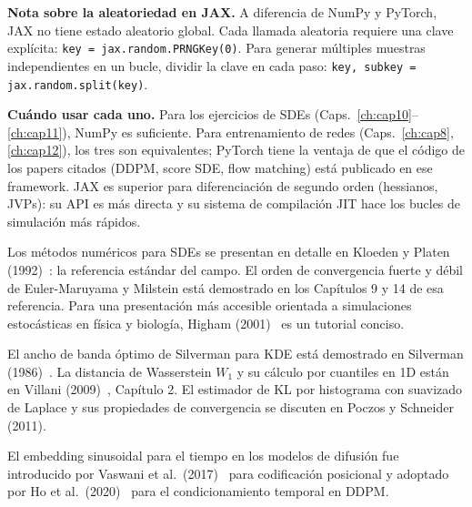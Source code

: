 \medskip
\noindent\textbf{Nota sobre la aleatoriedad en JAX.} A diferencia de NumPy y
PyTorch, JAX no tiene estado aleatorio global. Cada llamada aleatoria requiere
una clave explícita: \texttt{key = jax.random.PRNGKey(0)}. Para generar
múltiples muestras independientes en un bucle, dividir la clave en cada paso:
\texttt{key, subkey = jax.random.split(key)}.

\medskip
\noindent\textbf{Cuándo usar cada uno.}
Para los ejercicios de SDEs (Caps.~\ref{ch:cap10}--\ref{ch:cap11}),
NumPy es suficiente. Para entrenamiento de redes (Caps.~\ref{ch:cap8},
\ref{ch:cap12}), los tres son equivalentes; PyTorch tiene la ventaja de que
el código de los papers citados (DDPM, score SDE, flow matching) está
publicado en ese framework. JAX es superior para diferenciación de segundo
orden (hessianos, JVPs): su API es más directa y su sistema de
compilación JIT hace los bucles de simulación más rápidos.

\begin{notasbib}
Los métodos numéricos para SDEs se presentan en detalle en Kloeden y Platen
(1992)~\cite{kloeden1992numerical}: la referencia estándar del campo. El orden
de convergencia fuerte y débil de Euler-Maruyama y Milstein está demostrado en
los Capítulos 9 y 14 de esa referencia. Para una presentación más accesible
orientada a simulaciones estocásticas en física y biología, Higham
(2001)~\cite{higham2001algorithmic} es un tutorial conciso.

El ancho de banda óptimo de Silverman para KDE está demostrado en Silverman
(1986)~\cite{silverman1986density}. La distancia de Wasserstein $W_1$ y su
cálculo por cuantiles en 1D están en Villani (2009)~\cite{villani2009optimal},
Capítulo 2. El estimador de KL por histograma con suavizado de Laplace y sus
propiedades de convergencia se discuten en Poczos y Schneider (2011).

El embedding sinusoidal para el tiempo en los modelos de difusión fue introducido
por Vaswani et al.\ (2017)~\cite{vaswani2017attention} para codificación
posicional y adoptado por Ho et al.\ (2020)~\cite{ho2020denoising} para el
condicionamiento temporal en DDPM.
\end{notasbib}

\printbibliography[heading=subbibliography]